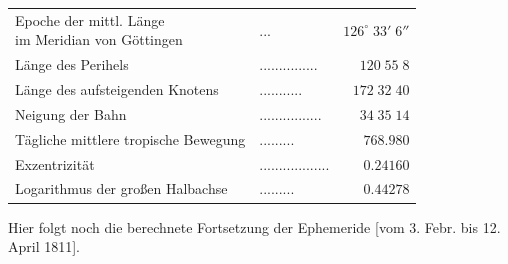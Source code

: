 \begin{center}\fontsize{10}{12}\selectfont\setlength{\tabcolsep}{4pt}\renewcommand{\arraystretch}{1.15}\begin{tabular}{llr}
\shortstack[l]{Epoche der mittl. Länge\\im Meridian von Göttingen} & .\;.\;. & $126^\circ\;33'\;6''$\\
Länge des Perihels & .\;.\;.\;.\;.\;.\;.\;.\;.\;.\;.\;.\;.\;.\;. & $120\;55\;8$\\
Länge des aufsteigenden Knotens & .\;.\;.\;.\;.\;.\;.\;.\;.\;.\;. & $172\;32\;40$\\
Neigung der Bahn & .\;.\;.\;.\;.\;.\;.\;.\;.\;.\;.\;.\;.\;.\;.\;. & $34\;35\;14$\\
Tägliche mittlere tropische Bewegung & .\;.\;.\;.\;.\;.\;.\;.\;. & $768.980$\\
Exzentrizität & .\;.\;.\;.\;.\;.\;.\;.\;.\;.\;.\;.\;.\;.\;.\;.\;.\;. & $0.24160$\\
Logarithmus der großen Halbachse & .\;.\;.\;.\;.\;.\;.\;.\;. & $0.44278$\\
\end{tabular}\end{center}

\par\indent Hier folgt noch die berechnete Fortsetzung der Ephemeride [vom 3. Febr. bis 12. April 1811].
